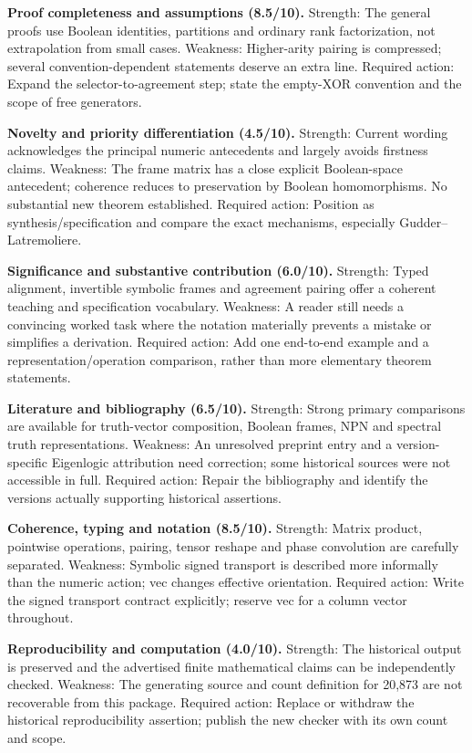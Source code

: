 \documentclass[
  10pt,
]{article}
\begin{document}
\textbf{Proof completeness and assumptions (8.5/10).} Strength: The
general proofs use Boolean identities, partitions and ordinary rank
factorization, not extrapolation from small cases. Weakness:
Higher-arity pairing is compressed; several convention-dependent
statements deserve an extra line. Required action: Expand the
selector-to-agreement step; state the empty-XOR convention and the scope
of free generators.

\textbf{Novelty and priority differentiation (4.5/10).} Strength:
Current wording acknowledges the principal numeric antecedents and
largely avoids firstness claims. Weakness: The frame matrix has a close
explicit Boolean-space antecedent; coherence reduces to preservation by
Boolean homomorphisms. No substantial new theorem established. Required
action: Position as synthesis/specification and compare the exact
mechanisms, especially Gudder--Latremoliere.

\textbf{Significance and substantive contribution (6.0/10).} Strength:
Typed alignment, invertible symbolic frames and agreement pairing offer
a coherent teaching and specification vocabulary. Weakness: A reader
still needs a convincing worked task where the notation materially
prevents a mistake or simplifies a derivation. Required action: Add one
end-to-end example and a representation/operation comparison, rather
than more elementary theorem statements.

\textbf{Literature and bibliography (6.5/10).} Strength: Strong primary
comparisons are available for truth-vector composition, Boolean frames,
NPN and spectral truth representations. Weakness: An unresolved preprint
entry and a version-specific Eigenlogic attribution need correction;
some historical sources were not accessible in full. Required action:
Repair the bibliography and identify the versions actually supporting
historical assertions.

\textbf{Coherence, typing and notation (8.5/10).} Strength: Matrix
product, pointwise operations, pairing, tensor reshape and phase
convolution are carefully separated. Weakness: Symbolic signed transport
is described more informally than the numeric action; vec changes
effective orientation. Required action: Write the signed transport
contract explicitly; reserve vec for a column vector throughout.

\textbf{Reproducibility and computation (4.0/10).} Strength: The
historical output is preserved and the advertised finite mathematical
claims can be independently checked. Weakness: The generating source and
count definition for 20,873 are not recoverable from this package.
Required action: Replace or withdraw the historical reproducibility
assertion; publish the new checker with its own count and scope.
\end{document}
